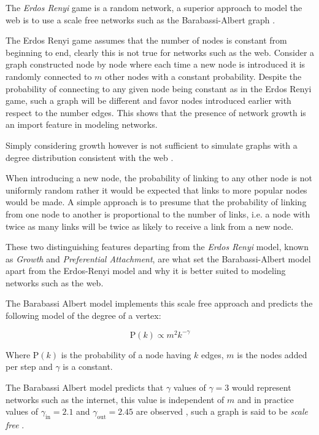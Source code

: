 \documentclass[11pt]{report}
\begin{document}
The \emph{Erdos Renyi} game is a random network, a superior approach to model the web
is to use a scale free networks \cite{barabasiPhysicsWeb2001} such as the
Barabassi-Albert graph \cite{barabasiScalefreeCharacteristicsRandom2000}.


The Erdos Renyi game assumes that the number of nodes is constant from beginning
to end, clearly this is not true for networks such as the web. Consider a graph
constructed node by node where each time a new node is introduced it is randomly
connected to \(m\) other nodes with a constant probability. Despite the probability of
connecting to any given node being constant as in the Erdos Renyi game, such a
graph will be different and favor nodes introduced earlier with respect to the number edges.
This shows that the presence of network growth is an import feature in modeling
networks.

Simply considering growth however is not sufficient to simulate graphs with a
degree distribution consistent with the web
\cite[Ch. 7]{zengPracticalSimulationMethod2013}.

When introducing a new node, the probability of linking to any other node is not
uniformly random rather it would be
expected that links to more popular nodes would be made. A simple approach is to presume that the probability of linking from
one node to another is proportional to the number of links, i.e. a node with
twice as many links will be twice as likely to receive a link from a new node.

These two distinguishing features departing from the \emph{Erdos Renyi} model, known as \emph{Growth} and \emph{Preferential Attachment}, are what set the Barabassi-Albert model apart from the Erdos-Renyi model and why it is better suited to modeling networks such as the web. \cite[Ch. 7]{barabasiLinkedNewScience2002}




The Barabassi Albert model implements this scale free approach and predicts the following model of the degree of a vertex:

\[
\mathrm{P}\left(k\right) \propto m^2 k^{-\gamma}
\]


Where \(\mathrm{P}\left(k\right)\) is the probability of a node having \(k\) edges, \(m\) is the nodes added per step and \(\gamma\) is a constant.

The Barabassi Albert model predicts that \(\gamma\) values of \(\gamma=3\) would
represent networks such as the internet, this value is independent of \(m\) and
in practice values of \(\gamma_{\mathrm{in}}= 2.1\) and
\(\gamma_{\mathrm{out}} = 2.45\) are observed
\cite[]{barabasiScalefreeCharacteristicsRandom2000}, such a graph is said to be
\textit{scale free} \cite[.2]{langvilleGooglePageRankScience2012}.
\end{document}
